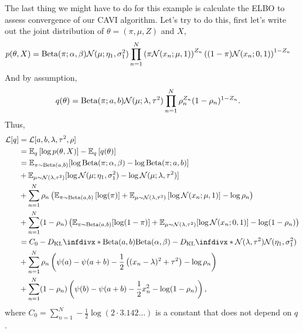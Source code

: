 The last thing we might have to do for this example is calculate the ELBO to assess convergence of our CAVI algorithm. Let's try to do this, first let's write out the joint distribution of $\theta=(\pi,\mu,Z)$ and $X$,
\begin{align*}
    p(\theta,X)&=\mathrm{Beta}(\pi;\alpha,\beta){\mathcal N}(\mu;\eta_1,\sigma_1^2)\prod_{n=1}^N \left(\pi\mathcal{N}(x_n;\mu,1)\right)^{Z_n}\left((1-\pi)\mathcal{N}(x_n;0,1)\right)^{1-Z_n}
\end{align*}
And by assumption,
\begin{align*}
    q(\theta)&=\mathrm{Beta}(\pi;a,b){\mathcal N}(\mu;\lambda,\tau^2)\prod_{n=1}^N\rho_n^{Z_n}(1-\rho_n)^{1-Z_n}.
\end{align*}
Thus,
\begin{align*}
    \mathcal{L}[q] &=\mathcal{L}[a,b,\lambda,\tau^2,\rho]\\
    &=\bbE_{q}\left[\log p(\theta,X)\right] - \bbE_q\left[q(\theta)\right]\\
    &=\bbE_{\pi \sim \mathrm{Beta}(a,b)}[\log \mathrm{Beta}(\pi;\alpha,\beta)-\log \mathrm{Beta}(\pi;a,b)] \\
    &+ \bbE_{\mu \sim \calN(\lambda,\tau^2 )}[\log \calN(\mu;\eta_1,\sigma^2_1)-\log \calN(\mu;\lambda,\tau^2)]\\
    &+\sum_{n=1}^N \rho_n\left(\bbE_{\pi \sim \mathrm{Beta}(a,b)}\left[\log(\pi)\right]+\bbE_{\mu \sim \calN(\lambda,\tau^2)}\left[\log \calN(x_n;\mu,1)\right]-\log \rho_n\right) \\
    &+\sum_{n=1}^N (1-\rho_n)\left(\bbE_{\pi \sim \mathrm{Beta}(a,b)}[\log(1-\pi)]+\bbE_{\mu \sim \calN(\lambda,\tau^2)}[\log \calN(x_n;0,1)] - \log(1-\rho_n)\right)\\
    &=C_0-\KLD{\mathrm{Beta}(a,b)}{\mathrm{Beta}(\alpha,\beta)}-\KLD{\calN(\lambda,\tau^2)}{\calN(\eta_1,\sigma_1^2)}\\
    &+\sum_{n=1}^N \rho_n\left(\psi(a)-\psi(a+b)-\frac{1}{2}\left((x_n-\lambda)^2 + \tau^2\right)-\log\rho_n\right)\\
    &+\sum_{n=1}^N (1-\rho_n)\left(\psi(b)-\psi(a+b) - \frac{1}{2}x_n^2-\log(1-\rho_n)\right),
\end{align*}
where $C_0 = \sum_{n=1}^N -\frac{1}{2}\log(2\cdot 3.142\ldots)$ is a constant that does not depend on $q$. 

